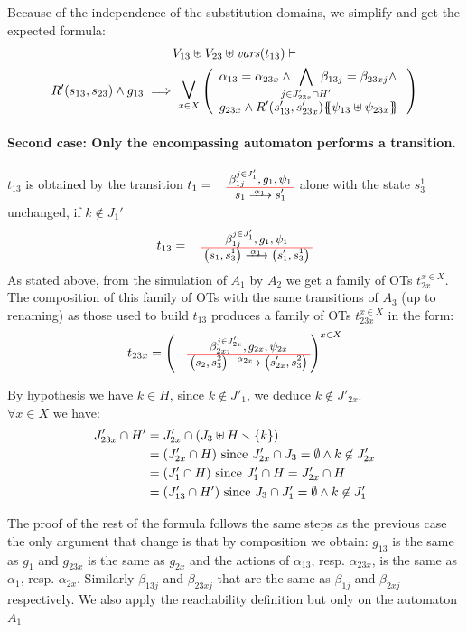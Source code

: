 \documentclass[runningheads]{llncs}
\begin{document}
\begin{enumerate}
Because of the independence of the substitution domains, we simplify and get the expected formula:
	\begin{multline*}
  V_{13} \uplus V_{23} \uplus \fvars{t_{13}} \vdash\\ R^{\prime}\mpar{s_{13}, s_{23}} \wedge g_{13} \implies \operatorname*{\bigsymb{\bigvee}}_{x \in X} \mpar{\everymath{\displaystyle}\begin{array}{l}
			\alpha_{13} = \alpha_{23x} \wedge \bigwedge_\subbox{j \in J'_{23x} \cap H'} \beta_{13j} = \beta_{23xj} \nwedge\\[12pt]
			 g_{23x} \wedge R^{\prime}\mpar{s'_{13}, s'_{23x}}\psubst{\psi_{13} \uplus \psi_{23x}}
		\end{array}} 
	\end{multline*}
	
\smallskip

\paragraph{Second case: Only the encompassing automaton performs a transition.}
 $t_{13}$ is obtained  by  the transition $t_1=\OTx{1}{}{1}{1}$ alone with the state $s^1_3$ unchanged, if $k \not\in J_1'$
\[t_{13} = \OT{\mpar{s_1, s^1_3}}{\mpar{s'_1, s^1_3}}{\alpha_1}{\beta_{1j}^{j \in J'_1}}{g_1}{\psi_1}
\]
As stated above, from the simulation of $A_1$ by $A_2$ we get a  family of OTs $t_{2x}^{x\in X}$. The composition of this family of OTs 
 with the same transitions of $A_3$ (up to renaming) as those used to build $t_{13}$ 
produces  a family of OTs $t_{23x}^{x\in X}$ in the form:
\[t_{23x} = \left(
\OT{\mpar{s_2, s^2_3}}{\mpar{s'_{2x}, s^2_3}}{\alpha_{2x}}{\beta_{2xj}^{j \in J'_{2x}}}{g_{2x}}{\psi_{2x}} \right)^{x\in X}\]

By hypothesis we have   $k \in H$, since $k \not\in J'_{1}$,  we deduce $k \not\in J'_{2x}$. \\
$\forall x \in X$ we have:
\begin{align*}		
J'_{23x} \cap H' & = J'_{2x}  \cap {\left(J_3 \uplus H \smallsetminus{\left\{k\right\}}\right)} \\
& = {\left(J'_{2x}\cap H \right)} \text{ since } J'_{2x}\cap J_3=\emptyset \land k\not\in J'_{2x} \\
& = {\left(J'_1\cap H \right)} \text{  since } J'_1 \cap H = J'_{2x} \cap H\\
& = {\left(J'_{13}\cap H' \right)} \text{ since } J_3\cap J'_1=\emptyset \land k\not\in J_1'
\end{align*}


The proof of the rest of the formula follows the same steps as the previous case the only argument that change is that by composition we obtain:  $g_{13} $ is the same as $ g_1$ and $g_{23x}$  is the same as $g_{2x}$ and the actions of $\alpha_{13}$, resp. $\alpha_{23x}$, is the same as  $\alpha_{1}$, resp. $\alpha_{2x}$. Similarly $\beta_{13j}$ and $\beta_{23xj}$ that are the same as $\beta_{1j}$ and $\beta_{2xj}$ respectively.
 We also apply the reachability definition but only on the automaton $A_1$


\end{enumerate}
\end{document}
